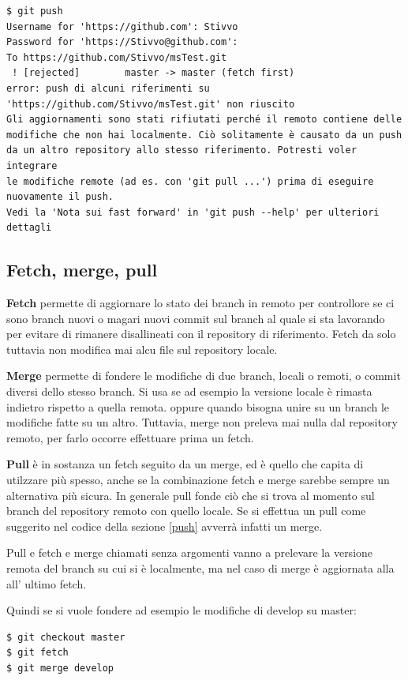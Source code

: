 \documentclass{article}
\begin{document}
\begin{verbatim}
$ git push
Username for 'https://github.com': Stivvo
Password for 'https://Stivvo@github.com':
To https://github.com/Stivvo/msTest.git
 ! [rejected]        master -> master (fetch first)
error: push di alcuni riferimenti su 'https://github.com/Stivvo/msTest.git' non riuscito
Gli aggiornamenti sono stati rifiutati perché il remoto contiene delle
modifiche che non hai localmente. Ciò solitamente è causato da un push
da un altro repository allo stesso riferimento. Potresti voler integrare
le modifiche remote (ad es. con 'git pull ...') prima di eseguire
nuovamente il push.
Vedi la 'Nota sui fast forward' in 'git push --help' per ulteriori
dettagli
\end{verbatim}

\subsection{Fetch, merge, pull\label{merge}}
\textbf{Fetch} permette di aggiornare lo stato dei branch in remoto per
controllore se ci sono branch nuovi o magari nuovi commit sul branch al quale si
sta lavorando per evitare di rimanere disallineati con il repository di riferimento.
Fetch da solo tuttavia non modifica mai alcu file sul repository locale.

\textbf{Merge} permette di fondere le modifiche di due branch, locali o remoti,
o commit diversi dello stesso branch.
Si usa se ad esempio la versione locale è rimasta indietro rispetto a quella remota.
oppure quando bisogna unire su un branch le modifiche fatte su un altro.
Tuttavia, merge non preleva mai nulla dal repository remoto, per farlo occorre
effettuare prima un fetch.

\textbf{Pull} è in sostanza un fetch seguito da un merge, ed è quello che capita
di utilzzare più spesso, anche se la combinazione fetch e merge sarebbe sempre
un alternativa più sicura.
In generale pull fonde ciò che si trova al momento sul branch del repository
remoto con quello locale.
Se si effettua un pull come suggerito nel codice della sezione \ref{push}
avverrà infatti un merge.

Pull e fetch e merge chiamati senza argomenti vanno a prelevare la versione
remota del branch su cui si è localmente, ma nel caso di merge è aggiornata alla
all' ultimo fetch.

Quindi se si vuole fondere ad esempio le modifiche di develop su master:

\begin{verbatim}
$ git checkout master
$ git fetch
$ git merge develop
\end{verbatim}
\end{document}
